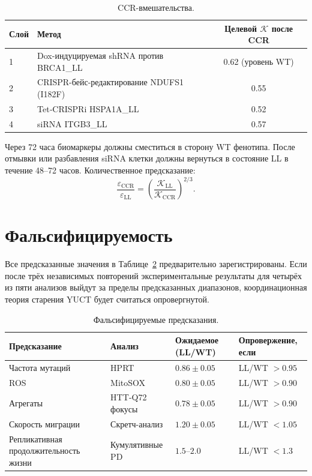 \documentclass[12pt,a4paper]{article}
\newcommand{\REL}{\mathcal{K}}          %
\begin{document}
	\begin{table}[H]
		\centering
		\caption{CCR-вмешательства.}
		\label{tab:CCR}
		\begin{tabular}{@{}llc@{}}
			\toprule
			\textbf{Слой} & \textbf{Метод} & \textbf{Целевой \(\REL\) после CCR} \\
			\midrule
			1 & Dox-индуцируемая shRNA против BRCA1\_LL & 0.62 (уровень WT) \\
			2 & CRISPR-бейс-редактирование NDUFS1 (I182F)       & 0.55 \\
			3 & Tet‑CRISPRi HSPA1A\_LL               & 0.52 \\
			4 & siRNA ITGB3\_LL                      & 0.57 \\
			\bottomrule
		\end{tabular}
	\end{table}
	
	Через 72 часа биомаркеры должны сместиться в сторону WT фенотипа. После отмывки или разбавления siRNA клетки должны вернуться в состояние LL в течение 48–72 часов. Количественное предсказание:
	\[
	\frac{\varepsilon_{\mathrm{CCR}}}{\varepsilon_{\mathrm{LL}}} = \left(\frac{\REL_{\mathrm{LL}}}{\REL_{\mathrm{CCR}}}\right)^{2/3}.
	\]
	
	\section{Фальсифицируемость}
	\label{sec:falsifiability}
	Все предсказанные значения в Таблице~\ref{tab:predictions} предварительно зарегистрированы. Если после трёх независимых повторений экспериментальные результаты для четырёх из пяти анализов выйдут за пределы предсказанных диапазонов, координационная теория старения YUCT будет считаться опровергнутой.
	
	\begin{table}[H]
		\centering
		\caption{Фальсифицируемые предсказания.}
		\label{tab:predictions}
		\begin{tabular}{@{}llll@{}}
			\toprule
			\textbf{Предсказание} & \textbf{Анализ} & \textbf{Ожидаемое (LL/WT)} & \textbf{Опровержение, если} \\
			\midrule
			Частота мутаций       & HPRT           & \(0.86 \pm 0.05\) & LL/WT \(> 0.95\) \\
			ROS                 & MitoSOX        & \(0.80 \pm 0.05\) & LL/WT \(> 0.90\) \\
			Агрегаты          & HTT‑Q72 фокусы   & \(0.78 \pm 0.05\) & LL/WT \(> 0.90\) \\
			Скорость миграции     & Скретч-анализ  & \(1.20 \pm 0.05\) & LL/WT \(< 1.05\) \\
			Репликативная продолжительность жизни & Кумулятивные PD  & \(1.5\)–\(2.0\)    & LL/WT \(< 1.3\) \\
			\bottomrule
		\end{tabular}
	\end{table}
	
\end{document}
